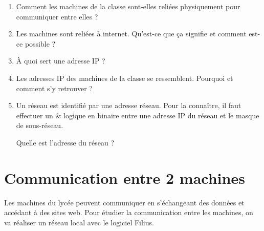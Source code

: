 \documentclass[12pt,a4paper]{article}
\begin{document}
\begin{enumerate}
\item Comment les machines de la classe sont-elles reliées physiquement pour communiquer entre elles ? \vspace{5cm}

\item Les machines sont reliées à internet. Qu'est-ce que ça signifie et comment est-ce possible ? \vspace{5cm}

\item À quoi sert une adresse IP ? \vspace{4cm}

\item Les adresses IP des machines de la classe se ressemblent. Pourquoi et comment s'y retrouver ? \vspace{2cm}

\item Un réseau est identifié par une adresse réseau. Pour la connaître, il faut effectuer un \& logique en binaire entre une adresse IP du réseau et le masque de sous-réseau.

Quelle est l'adresse du réseau ?

\end{enumerate}


\newpage
\section*{Communication entre 2 machines}

Les machines du lycée peuvent communiquer en s'échangeant des données et accédant à des sites web. Pour étudier la communication entre les machines, on va réaliser un réseau local avec le logiciel Filius.
\end{document}
